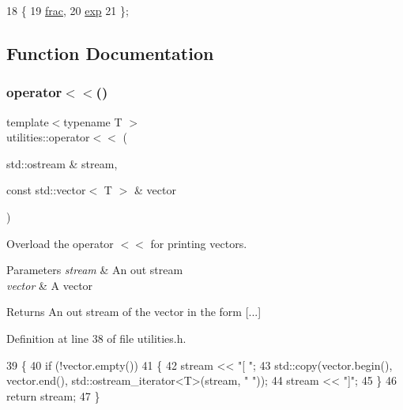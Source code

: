 \begin{DoxyCode}
18     \{
19         \hyperlink{namespaceutilities_ad4290e607d0651ce53db6e5c776aca7ca8a3baba97ec51277ed8ac64e456f6027}{frac}, 
20         \hyperlink{namespaceutilities_ad4290e607d0651ce53db6e5c776aca7cab0ab0254bd58eb87eaee3172ba49fefb}{exp} 
21     \};
\end{DoxyCode}


\subsection{Function Documentation}
\mbox{\label{namespaceutilities_a4b168c00efe29cabc5846b48225a6e52}} 
\subsubsection{\texorpdfstring{operator$<$$<$()}{operator<<()}}
{\footnotesize\ttfamily template$<$typename T $>$ \\
utilities\+::operator$<$$<$ (\begin{DoxyParamCaption}\item[{std\+::ostream \&}]{stream,  }\item[{const std\+::vector$<$ T $>$ \&}]{vector }\end{DoxyParamCaption})}



Overload the operator $<$$<$ for printing vectors. 


\begin{DoxyParams}{Parameters}
{\em stream} & An out stream \\
\hline
{\em vector} & A vector \\
\hline
\end{DoxyParams}
\begin{DoxyReturn}{Returns}
An out stream of the vector in the form \mbox{[}...\mbox{]} 
\end{DoxyReturn}


Definition at line 38 of file utilities.\+h.


\begin{DoxyCode}
39     \{
40         \textcolor{keywordflow}{if} (!vector.empty())
41         \{
42             stream << \textcolor{stringliteral}{"[ "};
43             std::copy(vector.begin(), vector.end(), std::ostream\_iterator<T>(stream, \textcolor{stringliteral}{" "}));
44             stream << \textcolor{stringliteral}{"]"};
45         \}
46         \textcolor{keywordflow}{return} stream;
47     \}
\end{DoxyCode}
